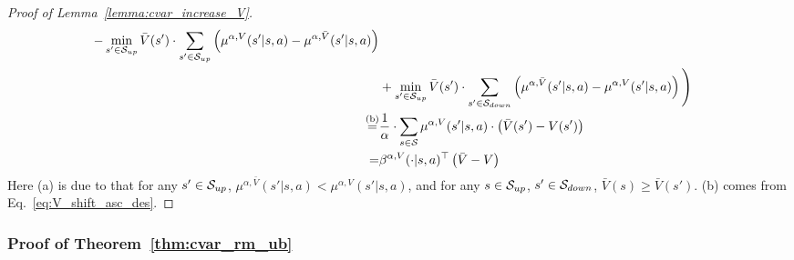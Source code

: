 \begin{proof}[Proof of Lemma~\ref{lemma:cvar_increase_V}]
\begin{align*}
		- \min_{s' \in \mathcal{S}_{up}}  \bar{V}(s') \cdot \sum_{s' \in \mathcal{S}_{up}} \left(  \mu^{\alpha,V}(s'|s,a) - \mu^{\alpha,\bar{V}}(s'|s,a)  \right) 
		\\ 
		& + \min_{s' \in \mathcal{S}_{up}}  \bar{V}(s') \cdot \sum_{s' \in \mathcal{S}_{down}}  
		\left(  \mu^{\alpha,\bar{V}}(s'|s,a) - \mu^{\alpha,V}(s'|s,a)  \right)  
		\Bigg)
		\\
		\overset{\textup{(b)}}{=} & \frac{1}{\alpha} \cdot  \sum_{s \in \mathcal{S}}  \mu^{\alpha,V}(s'|s,a) \cdot \left(  \bar{V}(s') - V(s')  \right) 
		\\
		= &  \beta^{\alpha,V}(\cdot|s,a)^\top \left(  \bar{V} - V  \right) 
	\end{align*}
	Here (a) is due to that for any $s' \in \mathcal{S}_{up}$,  $\mu^{\alpha,\bar{V}}(s'|s,a) < \mu^{\alpha,V}(s'|s,a)$, and for any $s \in \mathcal{S}_{up}$, $s' \in \mathcal{S}_{down}$, $\bar{V}(s) \geq \bar{V}(s')$. (b) comes from Eq.~\eqref{eq:V_shift_asc_des}.
	
\end{proof}



\subsubsection{Proof of Theorem~\ref{thm:cvar_rm_ub}}

